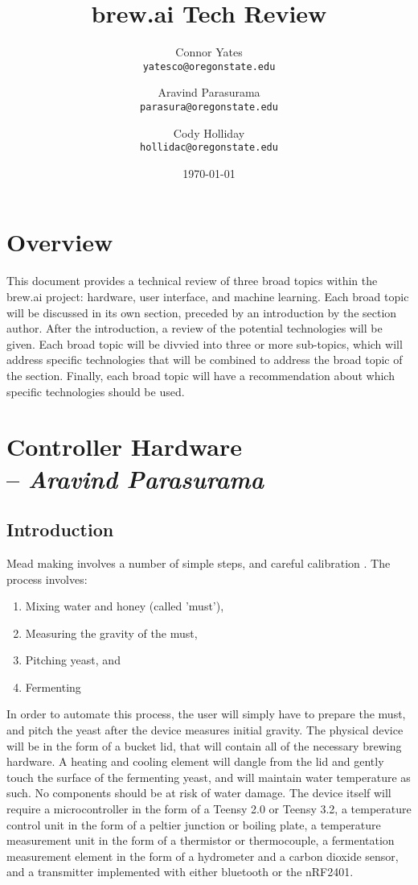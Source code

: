 \documentclass[draftclsnofoot,onecolumn,letterpaper,10pt]{IEEEtran}
\author{Connor Yates\\
\texttt{yatesco@oregonstate.edu\\}
\and
Aravind Parasurama\\
\texttt{parasura@oregonstate.edu\\}
\and
Cody Holliday\\
\texttt{hollidac@oregonstate.edu\\}}
\date{\today}
\title{brew.ai Tech Review}
\begin{document}
\maketitle

\newpage
\tableofcontents
\newpage
\section{Overview}
This document provides a technical review of three broad topics within the brew.ai project: hardware, user interface, and machine learning.
Each broad topic will be discussed in its own section, preceded by an introduction by the section author.
After the introduction, a review of the potential technologies will be given.
Each broad topic will be divvied into three or more sub-topics, which will address specific technologies that will be combined to address the broad topic of the section.
Finally, each broad topic will have a recommendation about which specific technologies should be used.

\section{Controller Hardware \\ -- \textbf{\textit{Aravind Parasurama}}}
\subsection{Introduction}
Mead making involves a number of simple steps, and careful calibration \cite{makingmead}. The process involves: 
\begin{enumerate}
	\item Mixing water and honey (called 'must'),
	\item Measuring the gravity of the must,
	\item Pitching yeast, and
	\item Fermenting
\end{enumerate}
In order to automate this process, the user will simply have to prepare the must, and pitch the yeast after the device measures initial gravity.
The physical device will be in the form of a bucket lid, that will contain all of the necessary brewing hardware. A heating and cooling element will
	dangle from the lid and gently touch the surface of the fermenting yeast, and will maintain water temperature as such. No components should be at
	risk of water damage.
The device itself will require a microcontroller in the form of a Teensy 2.0 or Teensy 3.2, a temperature control unit in the form of a peltier junction
	or boiling plate, a temperature measurement unit in the form of a thermistor or thermocouple, a fermentation measurement element in the form of a 
	hydrometer and a carbon dioxide sensor, and a transmitter implemented with either bluetooth or the nRF2401.
\end{document}
